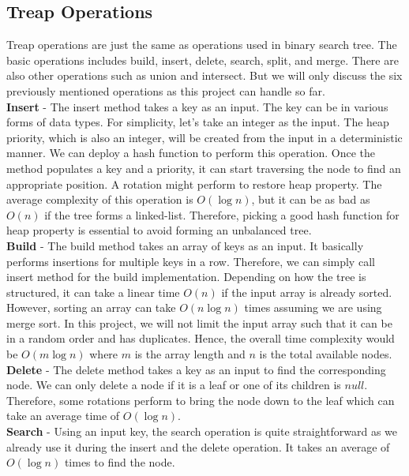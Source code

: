 \subsection{Treap Operations}
Treap operations are just the same as operations used in binary search tree. The basic operations includes build, insert, delete, search, split, and merge. There are also other operations such as union and intersect. But we will only discuss the six previously mentioned operations as this project can handle so far.\\

\noindent \textbf{Insert} - The insert method takes a key as an input. The key can be in various forms of data types. For simplicity, let's take an integer as the input. The heap priority, which is also an integer, will be created from the input in a deterministic manner. We can deploy a hash function to perform this operation. Once the method populates a key and a priority, it can start traversing the node to find an appropriate position. A rotation might perform to restore heap property. The average complexity of this operation is $O(\log n)$, but it can be as bad as $O(n)$ if the tree forms a linked-list. Therefore, picking a good hash function for heap property is essential to avoid forming an unbalanced tree.\\

\noindent \textbf{Build} - The build method takes an array of keys as an input. It basically performs insertions for multiple keys in a row. Therefore, we can simply call insert method for the build implementation. Depending on how the tree is structured, it can take a linear time $O(n)$ if the input array is already sorted. However, sorting an array can take $O(n \log n)$ times assuming we are using merge sort. In this project, we will not limit the input array such that it can be in a random order and has duplicates. Hence, the overall time complexity would be $O(m \log n)$ where $m$ is the array length and $n$ is the total available nodes.\\

\noindent \textbf{Delete} - The delete method takes a key as an input to find the corresponding node. We can only delete a node if it is a leaf or one of its children is $null$. Therefore, some rotations perform to bring the node down to the leaf which can take an average time of $O(\log n)$.\\

\noindent \textbf{Search} - Using an input key, the search operation is quite straightforward as we already use it during the insert and the delete operation. It takes an average of $O(\log n)$ times to find the node.\\

